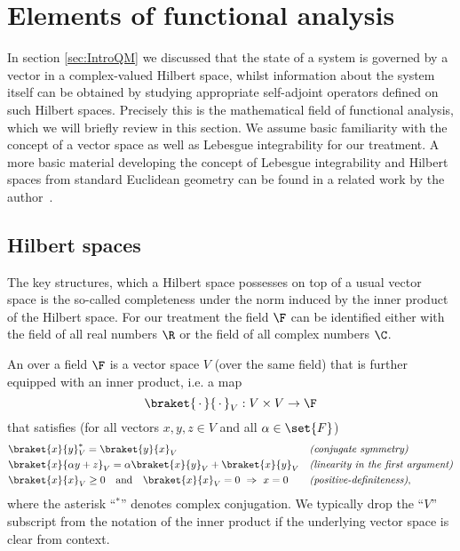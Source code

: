 \section{Elements of functional analysis}

In section \vref{sec:IntroQM} we discussed that the state
of a \QM system is governed by a vector in a complex-valued Hilbert space,
whilst information about the system itself can be obtained by studying
appropriate self-adjoint operators defined on such Hilbert spaces.
Precisely this is the mathematical field of functional analysis,
which we will briefly review in this section.
We assume basic familiarity with the concept of a vector space as well
as Lebesgue integrability for our treatment.
A more basic material developing the concept of Lebesgue integrability
and Hilbert spaces from standard Euclidean geometry can be found
in a related work by the author~\cite{DiracNotation}.

\subsection{Hilbert spaces}
\label{sec:Hilbert}

The key structures,
which a Hilbert space possesses on top of a usual vector space
is the so-called completeness under the norm induced
by the inner product of the Hilbert space.
For our treatment the field $\F$ can be identified
either with the field of all real numbers $\R$
or the field of all complex numbers $\C$.

\begin{defn}
	An  over a field $\F$
	is a vector space $V$ (over the same field)
	that is further equipped with an inner product, i.e. a map
	\[ \braket{\slot}{\slot}_V : V \times V \to \F \]
	that satisfies (for all vectors $x,y,z \in V$ and all $\alpha \in \set{F}$)
	\begin{align}
		\label{eqn:innProdConjSym}
			&\braket{x}{y}_V^\ast = \braket{y}{x}_V &&
			\text{\textit{(conjugate symmetry)}} \\
		\label{eqn:innProdLinLeft}
			&\braket{x}{\alpha y + z}_V = \alpha \braket{x}{y}_V + \braket{x}{y}_V &&
			\text{\textit{(linearity in the first argument)}} \\
		\label{eqn:innProdPosDef}
			&\braket{x}{x}_V \ge 0 \quad \text{and}
			\quad \braket{x}{x}_V = 0 ~\Rightarrow~ x = 0  &&
			\text{\textit{(positive-definiteness)}},
	\end{align}
	where the asterisk ``$^\ast$'' denotes complex conjugation.
	We typically drop the ``$V$'' subscript from the notation of the inner
	product if the underlying vector space is clear from context.
\end{defn}

